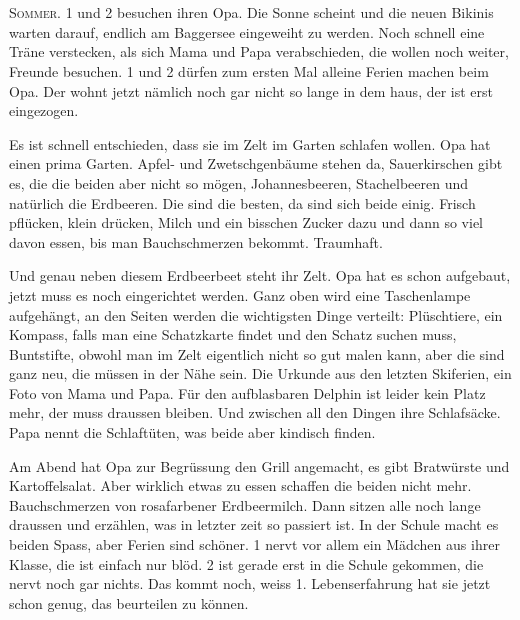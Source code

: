 \chapter*{}
\begin{mdframed}[style=mystyle]
\lettrine[lines=3]{\color{red}S}{ommer.} 1 und 2 besuchen ihren Opa. Die Sonne scheint und die neuen Bikinis warten darauf, endlich am Baggersee eingeweiht zu werden. Noch schnell eine Träne verstecken, als sich Mama und Papa verabschieden, die wollen noch weiter, Freunde besuchen. 1 und 2 dürfen zum ersten Mal alleine Ferien machen beim Opa. Der wohnt jetzt nämlich noch gar nicht so lange in dem haus, der ist erst eingezogen.

Es ist schnell entschieden, dass sie im Zelt im Garten schlafen wollen. Opa hat einen prima Garten. Apfel- und Zwetschgenbäume stehen da, Sauerkirschen gibt es, die die beiden aber nicht so mögen, Johannesbeeren, Stachelbeeren und natürlich die Erdbeeren. Die sind die besten, da sind sich beide einig. Frisch pflücken, klein drücken, Milch und ein bisschen Zucker dazu und dann so viel davon essen, bis man Bauchschmerzen bekommt. Traumhaft.

Und genau neben diesem Erdbeerbeet steht ihr Zelt. Opa hat es schon aufgebaut, jetzt muss es noch eingerichtet werden. Ganz oben wird eine Taschenlampe aufgehängt, an den Seiten werden die wichtigsten Dinge verteilt: Plüschtiere, ein Kompass, falls man eine Schatzkarte findet und den Schatz suchen muss, Buntstifte, obwohl man im Zelt eigentlich nicht so gut malen kann, aber die sind ganz neu, die müssen in der Nähe sein. Die Urkunde aus den letzten Skiferien, ein Foto von Mama und Papa. Für den aufblasbaren Delphin ist leider kein Platz mehr, der muss draussen bleiben. Und zwischen all den Dingen ihre Schlafsäcke. Papa nennt die Schlaftüten, was beide aber kindisch finden.

Am Abend hat Opa zur Begrüssung den Grill angemacht, es gibt Bratwürste und Kartoffelsalat. Aber wirklich etwas zu essen schaffen die beiden nicht mehr. Bauchschmerzen von rosafarbener Erdbeermilch. Dann sitzen alle noch lange draussen und erzählen, was in letzter zeit so passiert ist. In der Schule macht es beiden Spass, aber Ferien sind schöner. 1 nervt vor allem ein Mädchen aus ihrer Klasse, die ist einfach nur blöd. 2 ist gerade erst in die Schule gekommen, die nervt noch gar nichts. Das kommt noch, weiss 1. Lebenserfahrung hat sie jetzt schon genug, das beurteilen zu können.


\end{mdframed}
